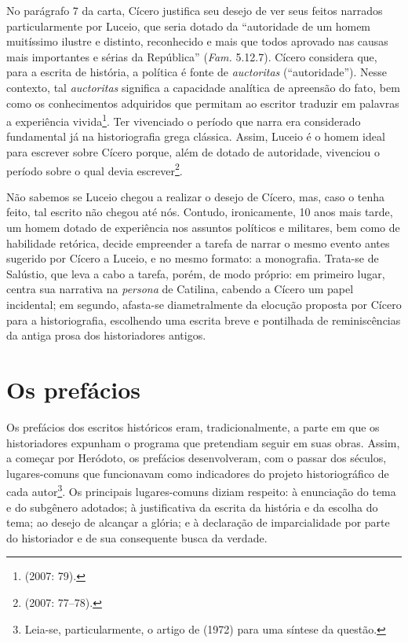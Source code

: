 No parágrafo 7 da carta, Cícero justifica seu desejo de ver seus feitos
narrados particularmente por Luceio, que seria dotado da “autoridade de um homem
muitíssimo ilustre e distinto, reconhecido e mais que todos aprovado nas causas
mais importantes e sérias da República” (\emph{Fam.} 5.12.7). Cícero
considera que, para a escrita de história, a política é fonte de
\emph{auctoritas} (``autoridade'').  Nesse contexto, tal \emph{auctoritas}
significa a capacidade analítica de apreensão do fato, bem como os conhecimentos
adquiridos que permitam ao escritor traduzir em palavras a experiência
vivida\footnote{  (2007: 79).}. Ter vivenciado o período que narra
era considerado fundamental já na historiografia grega clássica. Assim, Luceio
é o homem ideal para escrever sobre Cícero porque, além de dotado de
autoridade, vivenciou o período sobre o qual devia escrever\footnote{ (2007: 77--78).}.



Não sabemos se Luceio chegou a realizar o desejo de Cícero, mas, caso o tenha
feito, tal escrito não chegou até nós. Contudo, ironicamente, 10 anos mais
tarde, um homem dotado de experiência nos assuntos políticos e militares, bem
como de habilidade retórica, decide empreender a tarefa de narrar o mesmo evento antes
sugerido por Cícero a Luceio, e no mesmo formato: a monografia. Trata-se de
Salústio, que leva a cabo a tarefa, porém, de modo próprio: em primeiro lugar,
centra sua narrativa na \emph{persona} de Catilina, cabendo a Cícero um papel
incidental; em segundo, afasta-se diametralmente da elocução proposta por
Cícero para a historiografia, escolhendo uma escrita breve e pontilhada de
reminiscências da antiga prosa dos historiadores antigos.

 
\section{Os prefácios}


Os prefácios dos escritos históricos eram, tradicionalmente, a parte em que os
historiadores expunham o programa que pretendiam seguir em suas obras. Assim, a
começar por Heródoto, os prefácios desenvolveram, com o passar dos séculos,
lugares-comuns que funcionavam como indicadores do projeto historiográfico de
cada autor\footnote{Leia-se, particularmente, o artigo de  (1972) para uma
síntese da questão.}. Os principais lugares-comuns diziam respeito: à enunciação do
tema e do subgênero adotados; à justificativa da escrita da história e da
escolha do tema; ao desejo de alcançar a glória; e à declaração de
imparcialidade por parte do historiador e de sua consequente busca da verdade.  

